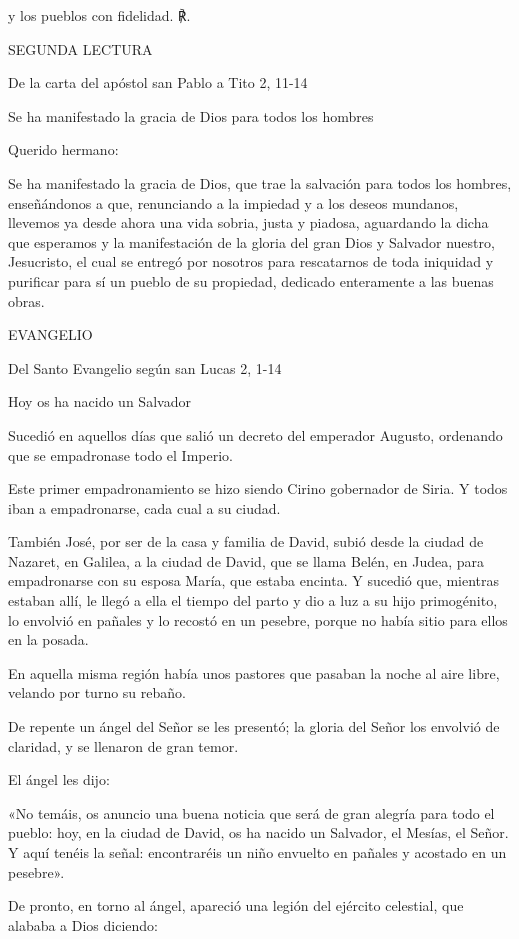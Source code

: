 y los pueblos con fidelidad. ℟.

SEGUNDA LECTURA

De la carta del apóstol san Pablo a Tito 2, 11-14

Se ha manifestado la gracia de Dios para todos los hombres

Querido hermano:

Se ha manifestado la gracia de Dios, que trae la salvación para todos
los hombres, enseñándonos a que, renunciando a la impiedad y a los
deseos mundanos, llevemos ya desde ahora una vida sobria, justa y
piadosa, aguardando la dicha que esperamos y la manifestación de la
gloria del gran Dios y Salvador nuestro, Jesucristo, el cual se entregó
por nosotros para rescatarnos de toda iniquidad y purificar para sí un
pueblo de su propiedad, dedicado enteramente a las buenas obras.

EVANGELIO

Del Santo Evangelio según san Lucas 2, 1-14

Hoy os ha nacido un Salvador

Sucedió en aquellos días que salió un decreto del emperador Augusto,
ordenando que se empadronase todo el Imperio.

Este primer empadronamiento se hizo siendo Cirino gobernador de Siria. Y
todos iban a empadronarse, cada cual a su ciudad.

También José, por ser de la casa y familia de David, subió desde la
ciudad de Nazaret, en Galilea, a la ciudad de David, que se llama Belén,
en Judea, para empadronarse con su esposa María, que estaba encinta. Y
sucedió que, mientras estaban allí, le llegó a ella el tiempo del parto
y dio a luz a su hijo primogénito, lo envolvió en pañales y lo recostó
en un pesebre, porque no había sitio para ellos en la posada.

En aquella misma región había unos pastores que pasaban la noche al aire
libre, velando por turno su rebaño.

De repente un ángel del Señor se les presentó; la gloria del Señor los
envolvió de claridad, y se llenaron de gran temor.

El ángel les dijo:

«No temáis, os anuncio una buena noticia que será de gran alegría para
todo el pueblo: hoy, en la ciudad de David, os ha nacido un Salvador, el
Mesías, el Señor. Y aquí tenéis la señal: encontraréis un niño envuelto
en pañales y acostado en un pesebre».

De pronto, en torno al ángel, apareció una legión del ejército
celestial, que alababa a Dios diciendo:

